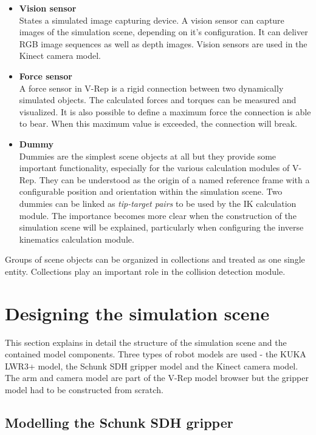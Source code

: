 \begin{itemize}
\item \textbf{Vision sensor} \\
States a simulated image capturing device. A vision sensor can capture images of the simulation scene, depending on it's configuration. It can deliver RGB image sequences as well as depth images. Vision sensors are used in the Kinect camera model.

\item \textbf{Force sensor} \\
A force sensor in V-Rep is a rigid connection between two dynamically simulated objects. The calculated forces and torques can be measured and visualized. It is also possible to define a maximum force the connection is able to bear. When this maximum value is exceeded, the connection will break.

\item \textbf{Dummy} \\
Dummies are the simplest scene objects at all but they provide some important functionality, especially for the various calculation modules of V-Rep. They can be understood as the origin of a named reference frame with a configurable position and orientation within the simulation scene. Two dummies can be linked as \emph{tip-target pairs} to be used by the IK calculation module. The importance becomes more clear when the construction of the simulation scene will be explained, particularly when configuring the inverse kinematics calculation module. 

\end{itemize}

Groups of scene objects can be organized in collections and treated as one single entity. Collections play an important role in the collision detection module.


\section{Designing the simulation scene}
This section explains in detail the structure of the simulation scene and the contained model components. Three types of robot models are used - the KUKA LWR3+ model, the Schunk SDH gripper model and the Kinect camera model. The arm and camera model are part of the V-Rep model browser but the gripper model had to be constructed from scratch.

\subsection{Modelling the Schunk SDH gripper}

